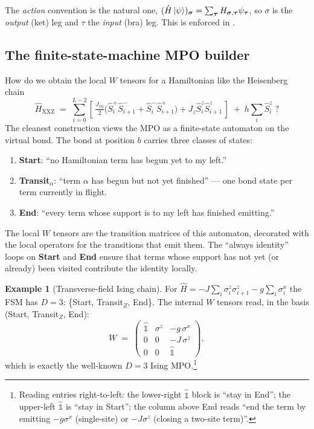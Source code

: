 \documentclass[11pt,a4paper]{article}
\theoremstyle{plain}
\theoremstyle{definition}
\newtheorem{example}[theorem]{Example}
\theoremstyle{remark}
\newcommand{\Id}{\mathbb{1}}
\renewcommand{\op}[1]{\hat{#1}}
\newcommand{\codefile}[1]{\path{#1}}
\begin{document}
The \emph{action} convention is the natural one,
$(\op H \ket{\psi})_{\bm\sigma} = \sum_{\bm\tau} H_{\bm\sigma,\bm\tau}
\psi_{\bm\tau}$, so $\sigma$ is the \emph{output} (ket) leg and $\tau$ the
\emph{input} (bra) leg.  This is enforced in
\codefile{src/dmrg_pp/operators/mpo.py}.

\subsection{The finite-state-machine MPO builder}
\label{sec:fsm}

How do we obtain the local $W$ tensors for a Hamiltonian like the Heisenberg
chain
\begin{equation}
  \op H_{\mathrm{XXZ}} \;=\;
  \sum_{i=0}^{L-2}
  \left[\,
    \tfrac{J_{xy}}{2}\bigl(\op S^{+}_i \op S^{-}_{i+1}
                          + \op S^{-}_i \op S^{+}_{i+1}\bigr)
    + J_z \op S^{z}_i \op S^{z}_{i+1}
  \,\right] \;+\; h \sum_i \op S^{z}_i\;?
\end{equation}
The cleanest construction views the MPO as a finite-state automaton on the
virtual bond.  The bond at position $b$ carries three classes of states:

\begin{enumerate}[leftmargin=2em,label=(\alph*)]
\item \textbf{Start}: ``no Hamiltonian term has begun yet to my left.''
\item \textbf{Transit$_\alpha$}: ``term $\alpha$ has begun but not yet
      finished'' --- one bond state per term currently in flight.
\item \textbf{End}: ``every term whose support is to my left has finished
      emitting.''
\end{enumerate}

The local $W$ tensors are the transition matrices of this automaton,
decorated with the local operators for the transitions that emit them.  The
``always identity'' loops on \textbf{Start} and \textbf{End} ensure that
terms whose support has not yet (or already) been visited contribute the
identity locally.

\begin{example}[Transverse-field Ising chain]
For
$\op H = -J\sum_i \sigma^z_i \sigma^z_{i+1} - g\sum_i \sigma^x_i$
the FSM has $D=3$: \{Start, Transit$_{Z}$, End\}.  The internal $W$ tensors
read, in the basis (Start, Transit$_Z$, End):
\begin{equation}
  W \;=\;
  \begin{pmatrix}
    \op{\Id}        & \sigma^z & -g\,\sigma^x \\
    0              & 0        & -J\,\sigma^z \\
    0              & 0        & \op{\Id}
  \end{pmatrix},
\end{equation}
which is exactly the well-known $D=3$ Ising MPO.\footnote{Reading entries
right-to-left: the lower-right $\op{\Id}$ block is ``stay in End''; the
upper-left $\op{\Id}$ is ``stay in Start''; the column above End reads ``end
the term by emitting $-g\sigma^x$ (single-site) or $-J\sigma^z$ (closing a
two-site term)''.}
\end{example}
\end{document}
